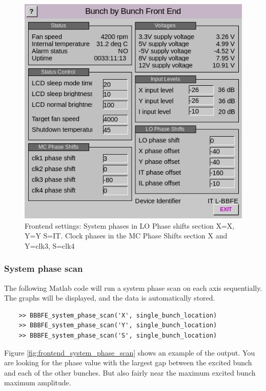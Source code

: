 \documentclass{report}
\begin{document}
\begin{figure}
    \centering
    \includegraphics[width=0.6\linewidth]{BBBFE_settings.png}
    \caption{Frontend settings: System phases in LO Phase shifts section  X=X, Y=Y S=IT. Clock phases in the MC Phase Shifts section X and Y=clk3, S=clk4}
    \label{fig:BBBFE_settings}
\end{figure}
\clearpage


\subsubsection{System phase scan}
 
The following Matlab code will run a system phase scan on each axis sequentially. The graphs will be displayed, and the data is automatically stored. 

\begin{verbatim}
    >> BBBFE_system_phase_scan('X', single_bunch_location)
    >> BBBFE_system_phase_scan('Y', single_bunch_location)
    >> BBBFE_system_phase_scan('S', single_bunch_location)
\end{verbatim}

Figure \ref{fig:frontend_system_phase_scan} shows an example of the output. You are looking for the phase value with the largest gap between the excited bunch and each of the other bunches. But also fairly near the maximum excited bunch maximum amplitude.
\end{document}

